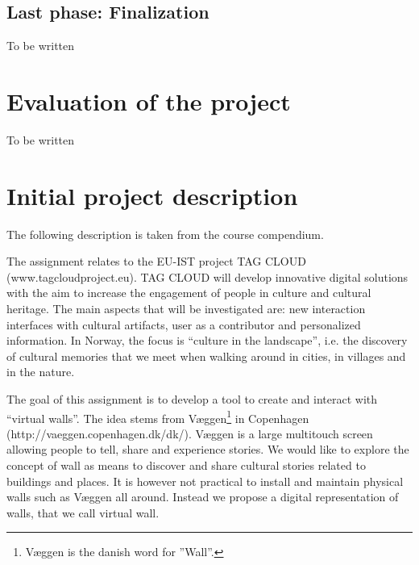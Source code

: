 \documentclass[11pt]{book}
\begin{document}
\section{Last phase: Finalization}
To be written

\chapter{Evaluation of the project}
To be written



\glsaddall
{}
\printglossaries

\appendix
\chapter{Initial project description}
The following description is taken from the course compendium\cite[p. 47]{compendium}.

The assignment relates to the EU-IST project TAG CLOUD (www.tagcloudproject.eu). TAG CLOUD will develop innovative digital solutions with the aim to increase the engagement of people in culture and cultural heritage. The main aspects that will be investigated are: new interaction interfaces with cultural artifacts, user as a contributor and personalized information. In Norway, the focus is ``culture in the landscape'', i.e. the discovery of cultural memories that we meet when walking around in cities, in villages and in the nature.

The goal of this assignment is to develop a tool to create and interact with ``virtual walls''. The idea stems from Væggen\footnote{Væggen is the danish word for ”Wall”.} in Copenhagen (http://vaeggen.copenhagen.dk/dk/). Væggen is a large multitouch screen allowing people to tell, share and experience stories. We would like to explore the concept of wall as means to discover and share cultural stories related to buildings and places. It is however not practical to install and maintain physical walls such as Væggen all around. Instead we propose a digital representation of walls, that we call virtual wall.
\end{document}
